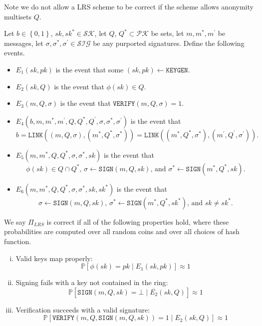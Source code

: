 \documentclass{llncs}
\newcommand{\prob}{\mathbb{P}}
\begin{document}
Note we do not allow a LRS scheme to be correct if the scheme allows anonymity multisets $Q$.

\begin{definition}\label{def:lrs-correct}
Let $b\in \left\{0,1\right\}$, $sk, sk^* \in \mathcal{SK}$, let $Q$, $Q^* \subset \mathcal{PK}$ be sets, let $m, m^*, m^\prime$ be messages, let $\sigma, \sigma^*, \sigma^\prime \in \mathcal{SIG}$ be any purported signatures. Define the following events.
\begin{itemize}
\item $E_1(sk, pk)$ is the event that some $(sk, pk) \leftarrow \texttt{KEYGEN}$.

\item $E_2(sk, Q)$ is the event that $\phi(sk) \in Q$.

\item $E_3(m, Q, \sigma)$ is the event that $\texttt{VERIFY}(m, Q, \sigma) = 1$.

\item $E_4(b, m, m^*, m^\prime, Q, Q^*, Q^\prime, \sigma, \sigma^*, \sigma^\prime)$ is the event that \[b = \texttt{LINK}((m, Q, \sigma), (m^*, Q^*, \sigma^*)) = \texttt{LINK}((m^*, Q^*, \sigma^*), (m^\prime, Q^\prime, \sigma^\prime)).\]

\item $E_5(m, m^*, Q, Q^*, \sigma, \sigma^*, sk)$ is the event that \[\phi(sk) \in Q \cap Q^*\text{, }\sigma \leftarrow \texttt{SIGN}(m, Q, sk)\text{, and }\sigma^* \leftarrow \texttt{SIGN}(m^*, Q^*, sk).\]

\item $E_6(m, m^*, Q, Q^*, \sigma, \sigma^*, sk, sk^*)$ is the event that  \[\sigma \leftarrow \texttt{SIGN}(m, Q, sk)\text{, }\sigma^* \leftarrow \texttt{SIGN}(m^*, Q^*, sk^*)\text{, and }sk \neq sk^*.\]
\end{itemize}
We say $\Pi_{LRS}$ is correct if all of the following properties hold, where these probabilities are computed over all random coins and over all choices of hash function.

\begin{enumerate}[(i)]
\item Valid keys map properly: $$\prob\left[ \phi(sk) = pk \mid E_1(sk, pk) \right] \approx 1$$

\item Signing fails with a key not contained in the ring: $$\prob\left[ \texttt{SIGN}(m, Q, sk) = \bot \mid \overline{E_2}(sk, Q)  \right] \approx 1$$

\item Verification succeeds with a valid signature: $$\prob\left[ \texttt{VERIFY}(m, Q, \texttt{SIGN}(m, Q, sk)) = 1 \mid E_2(sk, Q) \right] \approx 1$$


\end{enumerate}
\end{definition}
\end{document}

